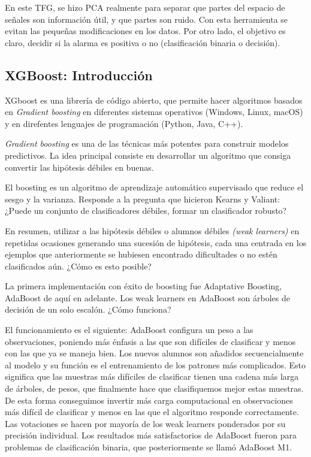 En este TFG, se hizo PCA realmente para separar que partes del espacio de señales son información útil, y que partes son ruido. Con esta herramienta se evitan las pequeñas modificaciones en los datos. Por otro lado, el objetivo es claro, decidir si la alarma es positiva o no (clasificación binaria o decisión).

\subsection{XGBoost: Introducción}

XGboost es una librería de código abierto, que permite hacer algoritmos basados en \textit{Gradient boosting} en diferentes sistemas operativos (Windows, Linux, macOS) y en direfentes lenguajes de programación (Python, Java, C++).\cite{wiki_xgboost}

\textit{Gradient boosting} es una de las técnicas más potentes para construir modelos predictivos. La idea principal consiste en desarrollar un algoritmo que consiga convertir las hipótesis débiles en buenas. \cite{XGBoost}\par 
El boosting es un algoritmo de aprendizaje automático supervisado que reduce el sesgo y la varianza. Responde a la pregunta que hicieron Kearns y Valiant: ¿Puede un conjunto de clasificadores débiles, formar un clasificador robusto? \par 
En resumen, utilizar a las hipótesis débiles o alumnos débiles \textit{(weak learners)} en repetidas ocasiones generando una sucesión de hipótesis, cada una centrada en los ejemplos que anteriormente se hubiesen encontrado dificultades o no estén clasificados aún. ¿Cómo es esto posible? 

La primera implementación con éxito de boosting fue Adaptative Boosting, AdaBoost de aquí en adelante. Los weak learners en AdaBoost son árboles de decisión de un solo escalón. ¿Cómo funciona?\par 

El funcionamiento es el siguiente:\cite{XGBoost}
AdaBoost configura un peso a las observaciones, poniendo más énfasis a las que son difíciles de clasificar y menos con las que ya se maneja bien. Los nuevos alumnos son añadidos secuencialmente al modelo y su función es el entrenamiento de los patrones más complicados. Esto significa que las muestras más difíciles de clasificar tienen una cadena más larga de árboles, de pesos, que finalmente hace que clasifiquemos mejor estas muestras. De esta forma conseguimos invertir más carga computacional en observaciones más difícil de clasificar y menos en las que el algoritmo responde correctamente.
Las votaciones se hacen por mayoría de los weak learners ponderados por su precisión individual. Los resultados más satisfactorios de AdaBoost fueron para problemas de clasificación binaria, que posteriormente se llamó AdaBoost M1.\par 


